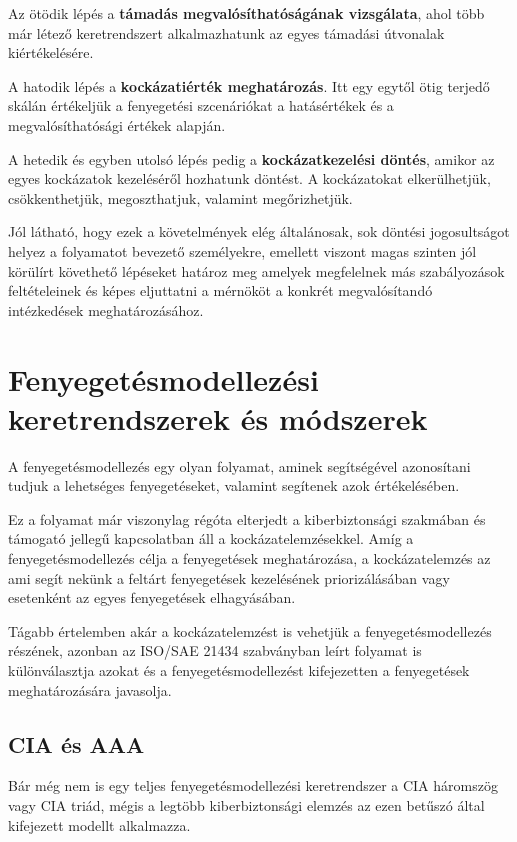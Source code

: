 Az ötödik lépés a \textbf{támadás megvalósíthatóságának vizsgálata}, ahol több már létező keretrendszert alkalmazhatunk az egyes támadási útvonalak kiértékelésére. 

A hatodik lépés a \textbf{kockázatiérték meghatározás}. Itt egy egytől ötig terjedő skálán értékeljük a fenyegetési szcenáriókat a hatásértékek és a megvalósíthatósági értékek alapján.

A hetedik és egyben utolsó lépés pedig a \textbf{kockázatkezelési döntés}, amikor az egyes kockázatok kezeléséről hozhatunk döntést. A kockázatokat elkerülhetjük, csökkenthetjük, megoszthatjuk, valamint megőrizhetjük.

Jól látható, hogy ezek a követelmények elég általánosak, sok döntési jogosultságot helyez a folyamatot bevezető személyekre, emellett viszont magas szinten jól körülírt követhető lépéseket határoz meg amelyek megfelelnek más szabályozások feltételeinek és képes eljuttatni a mérnököt a konkrét megvalósítandó intézkedések meghatározásához. 

\section{Fenyegetésmodellezési keretrendszerek és módszerek}

A fenyegetésmodellezés egy olyan folyamat, aminek segítségével azonosítani tudjuk a lehetséges fenyegetéseket, valamint segítenek azok értékelésében.

Ez a folyamat már viszonylag régóta elterjedt a kiberbiztonsági szakmában és támogató jellegű kapcsolatban áll a kockázatelemzésekkel. Amíg a fenyegetésmodellezés célja a fenyegetések meghatározása, a kockázatelemzés az ami segít nekünk a feltárt fenyegetések kezelésének priorizálásában vagy esetenként az egyes fenyegetések elhagyásában.

Tágabb értelemben akár a kockázatelemzést is vehetjük a fenyegetésmodellezés részének, azonban az ISO/SAE 21434 szabványban leírt folyamat is különválasztja azokat és a fenyegetésmodellezést kifejezetten a fenyegetések meghatározására javasolja.

\subsection{CIA és AAA}

Bár még nem is egy teljes fenyegetésmodellezési keretrendszer a CIA háromszög vagy CIA triád, mégis a legtöbb kiberbiztonsági elemzés az ezen betűszó által kifejezett modellt alkalmazza.

